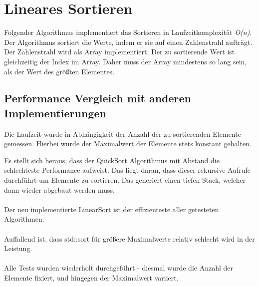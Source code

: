 \section{Lineares Sortieren}

Folgender Algorithmus implementiert das Sortieren in Laufzeitkomplexität \textit{O(n)}.\\


Der Algorithmus sortiert die Werte, indem er sie auf einen Zahlenstrahl aufträgt. Der Zahlenstrahl wird als Array implementiert. Der zu sortierende Wert ist gleichzeitig der Index im Array. Daher muss der Array mindestens so lang sein, als der Wert des größten Elementes.

\subsection{Performance Vergleich mit anderen Implementierungen}

Die Laufzeit wurde in Abhängigkeit der Anzahl der zu sortierenden Elemente gemessen. Hierbei wurde der Maximalwert der Elemente stets konstant gehalten.


Es stellt sich heraus, dass der QuickSort Algorithmus mit Abstand die schlechteste Performance aufweist. Das liegt daran, dass dieser rekursive Aufrufe durchführt um Elemente zu sortieren. Das generiert einen tiefen Stack, welcher dann wieder abgebaut werden muss.\\
\\
Der neu implementierte LinearSort ist der effizienteste aller getesteten Algorithmen.\\
\\
Auffallend ist, dass std::sort für größere Maximalwerte relativ schlecht wird in der Leistung.\\
\\
Alle Tests wurden wiederholt durchgeführt - diesmal wurde die Anzahl der Elemente fixiert, und hingegen der Maximalwert variiert.


